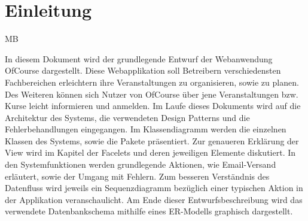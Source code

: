 \chapter{Einleitung}
\begin{tiny}
MB \\
\end{tiny}
In diesem Dokument wird der grundlegende Entwurf der Webanwendung OfCourse dargestellt. Diese Webapplikation soll Betreibern verschiedensten Fachbereichen erleichtern ihre Veranstaltungen zu organisieren, sowie zu planen. Des Weiteren können sich Nutzer von OfCourse über jene Veranstaltungen bzw. Kurse leicht informieren und anmelden. Im Laufe dieses Dokuments wird auf die Architektur des Systems, die verwendeten Design Patterns und die Fehlerbehandlungen eingegangen. Im Klassendiagramm werden die einzelnen Klassen des Systems, sowie die Pakete präsentiert. Zur genaueren Erklärung der View wird im Kapitel der Facelets und deren jeweiligen Elemente diskutiert. In den Systemfunktionen werden grundlegende Aktionen, wie Email-Versand erläutert, sowie der Umgang mit Fehlern. Zum besseren Verständnis des Datenfluss wird jeweils ein Sequenzdiagramm bezüglich einer typischen Aktion in der Applikation veranschaulicht. 
Am Ende dieser Entwurfsbeschreibung wird das verwendete Datenbankschema mithilfe eines ER-Modells graphisch dargestellt.
